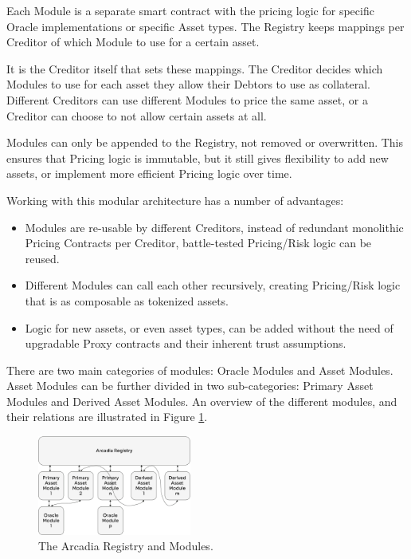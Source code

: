 \documentclass[sigconf,nonacm]{acmart}
\begin{document}
Each Module is a separate smart contract with the pricing logic for specific Oracle implementations or specific Asset types.
The Registry keeps mappings per Creditor of which Module to use for a certain asset.

It is the Creditor itself that sets these mappings. The Creditor decides which Modules to use for each asset they allow their Debtors to use as collateral.
Different Creditors can use different Modules to price the same asset, or a Creditor can choose to not allow certain assets at all.

Modules can only be appended to the Registry, not removed or overwritten.
This ensures that Pricing logic is immutable, but it still gives flexibility to add new assets, or implement more efficient Pricing logic over time.

Working with this modular architecture has a number of advantages:
\begin{itemize}
    \item Modules are re-usable by different Creditors, instead of redundant monolithic Pricing Contracts per Creditor, battle-tested Pricing/Risk logic can be reused.
    \item Different Modules can call each other recursively, creating Pricing/Risk logic that is as composable as tokenized assets.
    \item Logic for new assets, or even asset types, can be added without the need of upgradable Proxy contracts and their inherent trust assumptions.
\end{itemize}

There are two main categories of modules: Oracle Modules and Asset Modules.
Asset Modules can be further divided in two sub-categories: Primary Asset Modules and Derived Asset Modules.
An overview of the different modules, and their relations are illustrated in Figure \ref{fig:arcadia-registry}.

\begin{figure}
    \centering
    \includegraphics[width=0.45\textwidth]{images/Arcadia-Registry.png}
    \caption{The Arcadia Registry and Modules. \label{fig:arcadia-registry}}
\end{figure}
\end{document}
